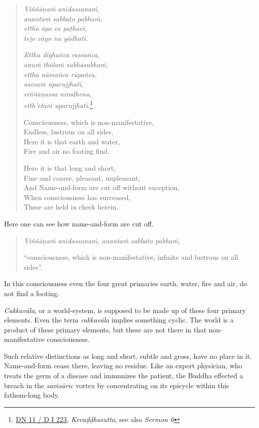 \begin{quote}
\emph{Viññāṇaṁ anidassanaṁ,}\\
\emph{anantaṁ sabbato pabhaṁ,}\\
\emph{ettha āpo ca paṭhavī,}\\
\emph{tejo vāyo na gādhati.}

\emph{Ettha dīghañca rassañca,}\\
\emph{aṇuṁ thūlaṁ subhāsubhaṁ,}\\
\emph{ettha nāmañca rūpañca,}\\
\emph{asesaṁ uparujjhati,}\\
\emph{viññāṇassa nirodhena,}\\
\emph{etth'etaṁ uparujjhati.}\footnote{\href{https://suttacentral.net/dn11/pli/ms}{DN 11 / D I 223}, \emph{Kevaḍḍhasutta}, see also \emph{Sermon 6}}

Consciousness, which is non-manifestative,\\
Endless, lustrous on all sides,\\
Here it is that earth and water,\\
Fire and air no footing find.

Here it is that long and short,\\
Fine and coarse, pleasant, unpleasant,\\
And Name-and-form are cut off without exception,\\
When consciousness has surceased,\\
These are held in check herein.
\end{quote}

Here one can see how name-and-form are cut off.

\begin{quote}
\emph{Viññāṇaṁ anidassanaṁ, anantaṁ sabbato pabhaṁ,}

``consciousness, which is non-manifestative, infinite and lustrous on all sides''.
\end{quote}

In this consciousness even the four great primaries earth, water, fire and air, do not find a footing.

\emph{Cakkavāla}, or a world-system, is supposed to be made up of these four primary elements. Even the term \emph{cakkavāla} implies something cyclic. The world is a product of these primary elements, but these are not there in that non-manifestative consciousness.

Such relative distinctions as long and short, subtle and gross, have no place in it. Name-and-form cease there, leaving no residue. Like an expert physician, who treats the germ of a disease and immunizes the patient, the Buddha effected a breach in the \emph{saṁsāric} vortex by concentrating on its epicycle within this fathom-long body.

